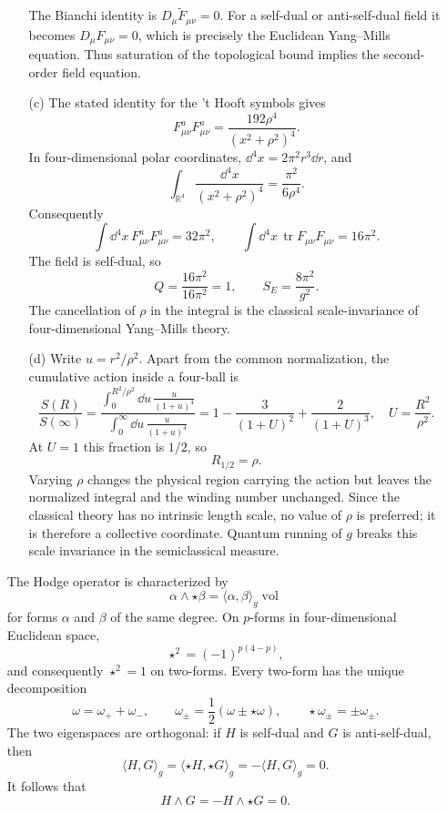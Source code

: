\begin{enumerate}
\begin{enumerate}
    The Bianchi identity is \(D_\mu\widetilde F_{\mu\nu}=0\).
    For a self-dual or anti-self-dual field it becomes
    \(D_\mu F_{\mu\nu}=0\), which is precisely the Euclidean Yang--Mills
    equation.  Thus saturation of the topological bound implies the
    second-order field equation.
    \item[(c)]
    The stated identity for the 't Hooft symbols gives
    \[
      F_{\mu\nu}^aF_{\mu\nu}^a
        =\frac{192\rho^4}{(x^2+\rho^2)^4}.
    \]
    In four-dimensional polar coordinates,
    \(\dd^4x=2\pi^2r^3\dd r\), and
    \[
      \int_{\mathbb R^4}\frac{\dd^4x}{(x^2+\rho^2)^4}
        =\frac{\pi^2}{6\rho^4}.
    \]
    Consequently
    \[
      \int \dd^4x\,F_{\mu\nu}^aF_{\mu\nu}^a=32\pi^2,\qquad
      \int \dd^4x\,\operatorname{tr}F_{\mu\nu}F_{\mu\nu}=16\pi^2.
    \]
    The field is self-dual, so
    \[
      Q=\frac{16\pi^2}{16\pi^2}=1,\qquad
      \boxed{S_E=\frac{8\pi^2}{g^2}.}
    \]
    The cancellation of \(\rho\) in the integral is the classical
    scale-invariance of four-dimensional Yang--Mills theory.
    \item[(d)]
    Write \(u=r^2/\rho^2\).  Apart from the common normalization, the
    cumulative action inside a four-ball is
    \[
      \frac{S(R)}{S(\infty)}
        =\frac{\displaystyle\int_0^{R^2/\rho^2}
            \dd u\,\frac{u}{(1+u)^4}}
          {\displaystyle\int_0^\infty
            \dd u\,\frac{u}{(1+u)^4}}
        =1-\frac3{(1+U)^2}+\frac2{(1+U)^3},
      \quad U=\frac{R^2}{\rho^2}.
    \]
    At \(U=1\) this fraction is \(1/2\), so
    \[
      \boxed{R_{1/2}=\rho.}
    \]
    Varying \(\rho\) changes the physical region carrying the action but
    leaves the normalized integral and the winding number unchanged.
    Since the classical theory has no intrinsic length scale, no value of
    \(\rho\) is preferred; it is therefore a collective coordinate.
    Quantum running of \(g\) breaks this scale invariance in the
    semiclassical measure.
  \end{enumerate}

  The Hodge operator is characterized by
  \[
    \alpha\wedge\star\beta
      =\langle\alpha,\beta\rangle_g\operatorname{vol}
  \]
  for forms \(\alpha\) and \(\beta\) of the same degree.  On
  \(p\)-forms in four-dimensional Euclidean space,
  \[
    \star^2=(-1)^{p(4-p)},
  \]
  and consequently \(\star^2=1\) on two-forms.  Every two-form has the
  unique decomposition
  \[
    \omega=\omega_++\omega_-,\qquad
    \omega_\pm=\frac12(\omega\pm\star\omega),
    \qquad \star\omega_\pm=\pm\omega_\pm.
  \]
  The two eigenspaces are orthogonal: if \(H\) is self-dual and \(G\)
  is anti-self-dual, then
  \[
    \langle H,G\rangle_g
      =\langle\star H,\star G\rangle_g
      =-\langle H,G\rangle_g=0.
  \]
  It follows that
  \[
    \boxed{H\wedge G=-H\wedge\star G=0.}
  \]


\end{enumerate}
